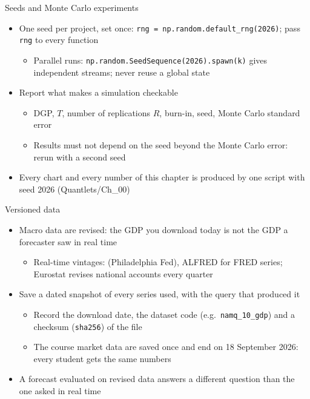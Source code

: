\begin{frame}{Seeds and Monte Carlo experiments}
\itemsize{\small}
\begin{itemize}
    \item One seed per project, set once: \texttt{rng = np.random.default\_rng(2026)}; pass \texttt{rng} to every function
    \begin{itemize}
        \item Parallel runs: \texttt{np.random.SeedSequence(2026).spawn(k)} gives independent streams; never reuse a global state
    \end{itemize}
    \item Report what makes a simulation checkable
    \begin{itemize}
        \item DGP, $T$, number of replications $R$, burn-in, seed, Monte Carlo standard error
        \item Results must not depend on the seed beyond the Monte Carlo error: rerun with a second seed
    \end{itemize}
    \item Every chart and every number of this chapter is produced by one script with seed 2026 (Quantlets/Ch\_00)
\end{itemize}
\end{frame}

\begin{frame}{Versioned data}
\itemsize{\small}
\begin{itemize}
    \item Macro data are revised: the GDP you download today is not the GDP a forecaster saw in real time
    \begin{itemize}
        \item Real-time vintages:  (Philadelphia Fed), ALFRED for FRED series; Eurostat revises national accounts every quarter
    \end{itemize}
    \item Save a dated snapshot of every series used, with the query that produced it
    \begin{itemize}
        \item Record the download date, the dataset code (e.g.\ \texttt{namq\_10\_gdp}) and a checksum (\texttt{sha256}) of the file
        \item The course market data are saved once and end on 18 September 2026: every student gets the same numbers
    \end{itemize}
    \item A forecast evaluated on revised data answers a different question than the one asked in real time
\end{itemize}
\end{frame}

